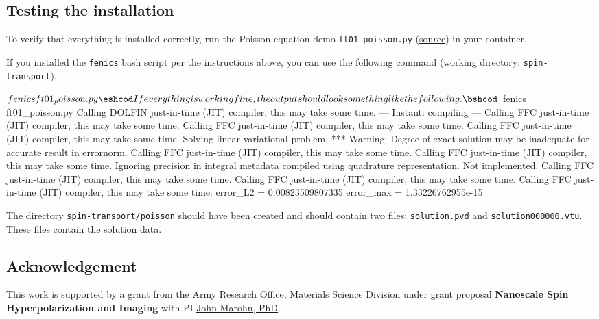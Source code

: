 \documentclass[%
oneside,                 %
final,                   %
10pt]{article}
\begin{document}
\subsection{Testing the installation}

To verify that everything is installed correctly, run the Poisson equation demo \Verb!ft01_poisson.py! (\href{{https://fenicsproject.org/pub/tutorial/html/._ftut1004.html}}{source}) in your container.

If you installed the \texttt{fenics} bash script per the instructions above, you can use the following command (working directory: \texttt{spin-transport}).

\bshcod
$ fenics ft01_poisson.py
\eshcod

If everything is working fine, the output should look something like the following.

\bshcod
$ fenics ft01_poisson.py
Calling DOLFIN just-in-time (JIT) compiler, this may take some time.
--- Instant: compiling ---
Calling FFC just-in-time (JIT) compiler, this may take some time.
Calling FFC just-in-time (JIT) compiler, this may take some time.
Calling FFC just-in-time (JIT) compiler, this may take some time.
Solving linear variational problem.
*** Warning: Degree of exact solution may be inadequate for accurate result in errornorm.
Calling FFC just-in-time (JIT) compiler, this may take some time.
Calling FFC just-in-time (JIT) compiler, this may take some time.
  Ignoring precision in integral metadata compiled using quadrature representation. Not implemented.
Calling FFC just-in-time (JIT) compiler, this may take some time.
Calling FFC just-in-time (JIT) compiler, this may take some time.
Calling FFC just-in-time (JIT) compiler, this may take some time.
error_L2  = 0.00823509807335
error_max = 1.33226762955e-15
\eshcod

The directory \texttt{spin-transport/poisson} should have been created and should contain two files: \texttt{solution.pvd} and \texttt{solution000000.vtu}.
These files contain the solution data.

\subsection{Acknowledgement}

This work is supported by a grant from the Army Research Office, Materials Science Division under grant proposal \textbf{Nanoscale Spin Hyperpolarization and Imaging}
with PI \href{{http://marohn.chem.cornell.edu/}}{John Marohn, PhD}.
\end{document}
